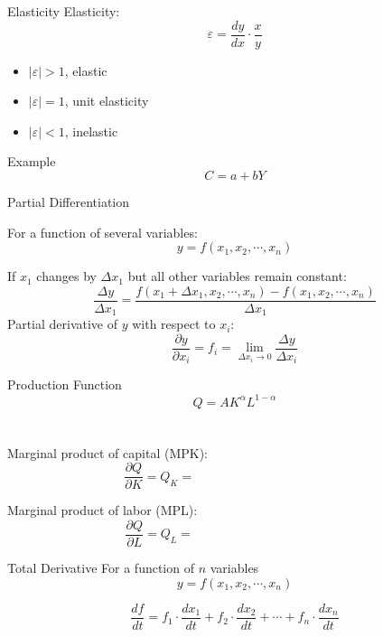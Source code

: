 \documentclass{./../../Latex/teaching_slides}
\begin{document}
\begin{frame}{Elasticity}
Elasticity: 
\[ \varepsilon = \frac{dy}{dx} \cdot \frac{x}{y} \]
\vspace{1cm}
\begin{itemize}
	\item $|\varepsilon|>1$, elastic
	\item $|\varepsilon|=1$, unit elasticity
	\item $|\varepsilon|<1$, inelastic
\end{itemize}
\end{frame}

\begin{frame}{Example}
$$ C = a + bY $$
\end{frame}


\begin{frame}{Partial Differentiation}

For a function of several variables:
$$
y=f\left(x_{1}, x_{2}, \cdots, x_{n}\right)
$$

If $x_1$ changes by $\Delta x_1$ but all other variables remain constant: 
$$
\frac{\Delta y}{\Delta x_{1}}=\frac{f\left(x_{1}+\Delta x_1, x_{2}, \cdots, x_{n}\right)-f\left(x_{1}, x_{2}, \cdots, x_{n}\right)}{\Delta x_{1}}
$$
Partial derivative of $y$ with respect to $x_i$:
$$
\frac{\partial y}{\partial x_{i}}= f_i = \lim _{\Delta x_{i} \rightarrow 0} \frac{\Delta y}{\Delta x_{i}}
$$
\end{frame}

\begin{frame}{Production Function}
$$ Q = A K^{\alpha} L^{1-\alpha} $$ \\~\\

Marginal product of capital (MPK):
	$$\frac{\partial Q}{ \partial K} = Q_K =  \hspace{5cm} $$

Marginal product of labor (MPL):
	$$\frac{\partial Q}{ \partial L} = Q_L =  \hspace{5cm} $$
\end{frame}

\begin{frame}{Total Derivative}
For a function of $n$ variables \[y=f\left(x_{1}, x_{2}, \cdots, x_{n}\right)\]

\[
\frac{d f}{d t}= f_1 \cdot \frac{d x_{1}}{d t} +f_2\cdot \frac{d x_{2}}{d t}+\cdots+f_n \cdot\frac{d x_{n}}{d t} \]
\end{frame}
\end{document}
